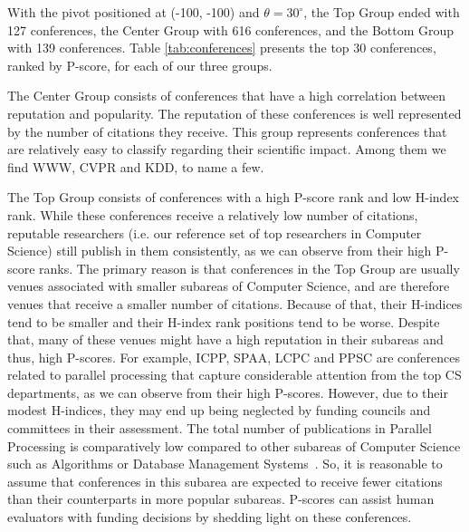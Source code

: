 \documentclass[notitlepage]{svjour3}
\begin{document}
With the pivot positioned at (-100, -100) and $ \theta=30^{\circ} $, the Top Group ended with 127 conferences, the 
Center Group with 616 conferences, and the Bottom Group with 139 conferences. Table 
\ref{tab:conferences} presents the top 30 conferences, ranked by P-score, for each of our three groups.

The Center Group consists of conferences that have a high correlation between reputation and
popularity. The reputation of these conferences is well represented by the number of citations
they receive. This group represents conferences that are relatively easy to classify regarding
their scientific impact. Among them we find WWW, CVPR and KDD, to name a few.

The Top Group consists of conferences with a high P-score rank and low H-index rank. While these conferences
receive a relatively low number of citations, reputable researchers (i.e. our reference set of top researchers in Computer Science) still publish 
in them consistently, as we can observe from their high P-score ranks. The primary reason is that
conferences in the Top Group are usually venues associated with smaller subareas of Computer Science, and are therefore venues that receive a smaller
number of citations. Because of that, their H-indices tend to be smaller and their H-index rank positions tend to be worse. Despite that, many of these venues might have a high reputation in their subareas and thus, high P-scores. 
For example, ICPP, SPAA, LCPC and PPSC are conferences related to parallel processing that capture
considerable attention from the top CS departments, as we can observe from their high P-scores. However,
due to their modest H-indices, they may end up being neglected by funding councils and committees in
their assessment. The total number of publications in Parallel Processing is comparatively low 
compared to other subareas of Computer Science such as Algorithms or Database Management Systems~\cite{Hoonlor2013}. So, it is reasonable to assume that conferences 
in this subarea are expected to receive fewer citations than their counterparts in more popular subareas.
P-scores can assist human evaluators with funding decisions by shedding light on these conferences.
\end{document}
